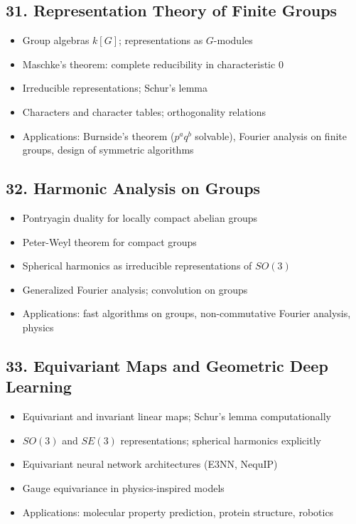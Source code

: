 \subsection{31. Representation Theory of Finite Groups}
\begin{itemize}
\item Group algebras $k[G]$; representations as $G$-modules
\item Maschke's theorem: complete reducibility in characteristic 0
\item Irreducible representations; Schur's lemma
\item Characters and character tables; orthogonality relations
\item Applications: Burnside's theorem ($p^a q^b$ solvable), Fourier analysis on finite groups, design of symmetric algorithms
\end{itemize}

\subsection{32. Harmonic Analysis on Groups}
\begin{itemize}
\item Pontryagin duality for locally compact abelian groups
\item Peter-Weyl theorem for compact groups
\item Spherical harmonics as irreducible representations of $SO(3)$
\item Generalized Fourier analysis; convolution on groups
\item Applications: fast algorithms on groups, non-commutative Fourier analysis, physics
\end{itemize}

\subsection{33. Equivariant Maps and Geometric Deep Learning}
\begin{itemize}
\item Equivariant and invariant linear maps; Schur's lemma computationally
\item $SO(3)$ and $SE(3)$ representations; spherical harmonics explicitly
\item Equivariant neural network architectures (E3NN, NequIP)
\item Gauge equivariance in physics-inspired models
\item Applications: molecular property prediction, protein structure, robotics
\end{itemize}

